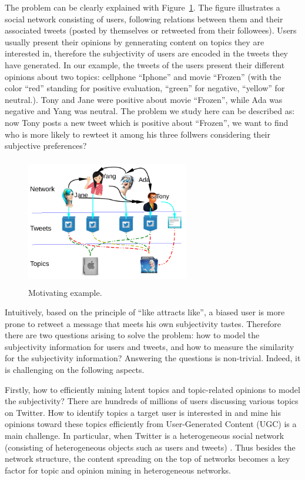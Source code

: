 \documentclass{acm_proc_article-sp}
\begin{document}
The problem can be clearly explained with Figure~\ref{fig00}. The figure illustrates a social network consisting of users, following relations between them and their associated tweets (posted by themselves or retweeted from their followees). Users usually present their opinions by gennerating content on topics they are interested in, therefore the subjectivity of users are encoded in the tweets they have generated. In our example, the tweets of the users present their different opinions about two topics: cellphone ``Iphone'' and movie ``Frozen'' (with the color ``red'' standing for positive evaluation, ``green'' for negative, ``yellow'' for neutral.). Tony and Jane were positive about movie ``Frozen'', while Ada was negative and Yang was neutral. The problem we study here can be described as: now Tony posts a new tweet which is positive about ``Frozen'', we want to find who is more likely to rewteet it among his three follwers considering their subjective preferences?
\begin{figure}[htb]
\centering
\includegraphics[width=2.8in,height=2.2in]{Mexample.pdf}
\caption{Motivating example.}
\label{fig00}
\end{figure}

Intuitively, based on the principle of ``like attracts like'', a biased user is more prone to retweet a message that meets his own subjectivity tastes. Therefore there are two questions arising to solve the problem: how to model the subjectivity information for users and tweets, and how to measure the similarity for the subjectivity information? 
Answering the questions is non-trivial. Indeed, it is challenging on the following aspects.

Firstly, how to efficiently mining latent topics and topic-related opinions to model the subjectivity? There are hundreds of millions of users discussing various topics on Twitter. How to identify topics a target user is interested in and mine his opinions toward these topics efficiently from User-Generated Content (UGC) is a main challenge. In particular, when Twitter is a heterogeneous social network (consisting of heterogeneous objects such as users and tweets) \cite{kwak2010twitter}. Thus besides the network structure, the content spreading on the top of networks becomes a key factor for topic and opinion mining in heterogeneous networks.
\end{document}
